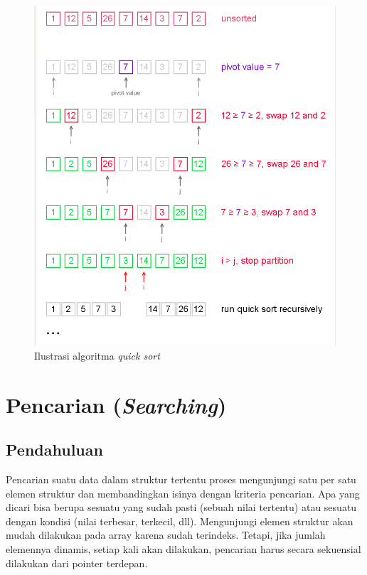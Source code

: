 \begin{figure}[H]
\centering
\includegraphics[scale=.45]{pics/quicksort.png}
\caption{Ilustrasi algoritma \textit{quick sort}}
\label{fig:quick}
\end{figure}

\scriptsize

\normalsize

\chapter{Pencarian (\textit{Searching})}
\section{Pendahuluan}
Pencarian suatu data dalam struktur tertentu proses mengunjungi satu per satu elemen struktur dan membandingkan isinya dengan kriteria pencarian. Apa yang dicari bisa berupa sesuatu yang sudah pasti (sebuah nilai tertentu) atau sesuatu dengan kondisi (nilai terbesar, terkecil, dll). Mengunjungi elemen struktur akan mudah dilakukan pada array karena sudah terindeks. Tetapi, jika jumlah elemennya dinamis, setiap kali akan dilakukan, pencarian harus secara sekuensial dilakukan dari pointer terdepan. 

